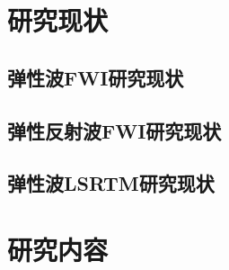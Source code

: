 \section{研究现状}
\subsection{弹性波FWI研究现状}
\subsection{弹性反射波FWI研究现状}
\subsection{弹性波LSRTM研究现状}
\section{研究内容}
